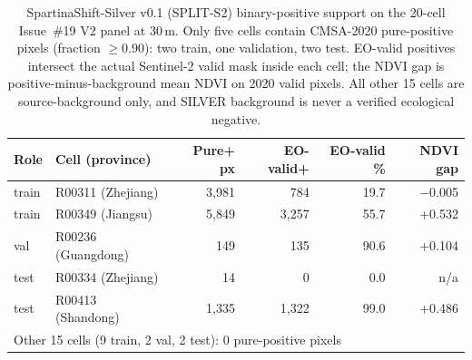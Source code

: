 \begin{table}[t]
\centering
\small
\caption{SpartinaShift-Silver v0.1 (SPLIT-S2) binary-positive support on
the 20-cell Issue~\#19 V2 panel at 30\,m. Only five cells contain
CMSA-2020 pure-positive pixels (fraction $\geq$0.90): two train, one
validation, two test. EO-valid positives intersect the actual Sentinel-2
valid mask inside each cell; the NDVI gap is positive-minus-background
mean NDVI on 2020 valid pixels. All other 15 cells are source-background
only, and SILVER background is never a verified ecological negative.}
\label{tab:silversupport}
\begin{tabular}{llrrrr}
\toprule
Role & Cell (province) & Pure+ px & EO-valid+ & EO-valid \% & NDVI gap \\
\midrule
train & R00311 (Zhejiang) & 3{,}981 & 784 & 19.7 & $-$0.005 \\
train & R00349 (Jiangsu) & 5{,}849 & 3{,}257 & 55.7 & +0.532 \\
val   & R00236 (Guangdong) & 149 & 135 & 90.6 & +0.104 \\
test  & R00334 (Zhejiang) & 14 & 0 & 0.0 & n/a \\
test  & R00413 (Shandong) & 1{,}335 & 1{,}322 & 99.0 & +0.486 \\
\midrule
\multicolumn{6}{l}{Other 15 cells (9 train, 2 val, 2 test): 0 pure-positive pixels} \\
\bottomrule
\end{tabular}
\end{table}
